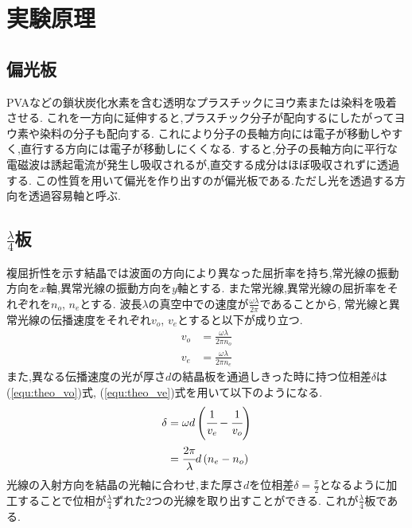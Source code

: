 \section{実験原理}
\subsection{偏光板}
PVAなどの鎖状炭化水素を含む透明なプラスチックにヨウ素または染料を吸着させる.\cite{yokuwakaru}
これを一方向に延伸すると,プラスチック分子が配向するにしたがってヨウ素や染料の分子も配向する.
これにより分子の長軸方向には電子が移動しやすく,直行する方向には電子が移動しにくくなる.
すると,分子の長軸方向に平行な電磁波は誘起電流が発生し吸収されるが,直交する成分はほぼ吸収されずに透過する.
この性質を用いて偏光を作り出すのが偏光板である.\cite{rikougaku}ただし光を透過する方向を透過容易軸と呼ぶ.
\subsection{$\frac{\lambda}{4}$板}
複屈折性を示す結晶では波面の方向により異なった屈折率を持ち,常光線の振動方向を$x$軸,異常光線の振動方向を$y$軸とする.
また常光線,異常光線の屈折率をそれぞれを$n_o$, $n_e$とする.
波長$\lambda$の真空中での速度が$\frac{\omega\lambda}{2\pi}$であることから,
常光線と異常光線の伝播速度をそれぞれ$v_o$, $v_e$とすると以下が成り立つ.
\begin{align}
  \label{equ:theo_vo}
  v_o&=\frac{\omega\lambda}{2\pi n_o}\\
  \label{equ:theo_ve}
  v_e&=\frac{\omega\lambda}{2\pi n_e}
\end{align}
また,異なる伝播速度の光が厚さ$d$の結晶板を通過しきった時に持つ位相差$\delta$は(\ref{equ:theo_vo})式, (\ref{equ:theo_ve})式を用いて以下のようになる.
\begin{align}
  \label{equ:theo_del}
  \begin{split}
  \delta&=\omega d\left(\cfrac{1}{v_e}-\cfrac{1}{v_o}\right)\\
  &=\cfrac{2\pi}{\lambda}d\left(n_e-n_o\right)
  \end{split}
\end{align}
光線の入射方向を結晶の光軸に合わせ,また厚さ$d$を位相差$\delta=\frac{\pi}{2}$となるように加工することで位相が$\frac{\lambda}{4}$ずれた2つの光線を取り出すことができる.
これが$\frac{\lambda}{4}$板である.